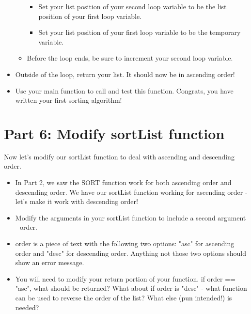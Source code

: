 \documentclass{article}
\begin{document}
\begin{itemize}
\begin{itemize}
\begin{itemize}
    			\item Set your list position of your second loop variable to be the list position of your first loop variable.
    			\item Set your list position of your first loop variable to be the temporary variable.
    		\end{itemize}
    		\item Before the loop ends, be sure to increment your second loop variable.
    	\end{itemize}
    	\item Outside of the loop, return your list. It should now be in ascending order!
    	\item Use your main function to call and test this function.  Congrats, you have written your first sorting algorithm!
\end{itemize}

\section*{Part 6: Modify sortList function}
Now let's modify our sortList function to deal with ascending and descending order.
\begin{itemize}
	\item In Part 2, we saw the SORT function work for both ascending order and descending order.  We have our sortList function working for ascending order - let's make it work with descending order!
	\item Modify the arguments in your sortList function to include a second argument - order.
	\item order is a piece of text with the following two options:  "asc" for ascending order and "desc" for descending order.  Anything not those two options should show an error message.
	\item You will need to modify your return portion of your function.  if order == "asc", what should be returned?  What about if order is "desc"  - what function can be used to reverse the order of the list?  What else (pun intended!) is needed?
\end{itemize}
\end{document}
